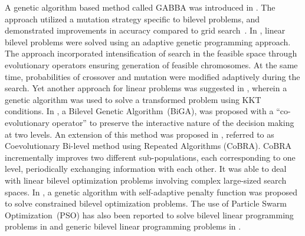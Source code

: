 A genetic algorithm based method called GABBA was introduced in \cite{mathieu1994genetic}. The approach utilized a mutation strategy specific to bilevel problems, and demonstrated improvements in accuracy compared to grid search~\cite{bard1983efficient}. In \cite{wang2007adaptive}, linear bilevel problems were solved using an adaptive genetic programming approach. The approach incorporated intensification of search in the feasible space through evolutionary operators ensuring generation of feasible chromosomes. At the same time, probabilities of crossover and mutation were modified adaptively during the search. Yet another approach for linear problems was suggested in \cite{hejazi2002linear}, wherein a genetic algorithm was used to solve a transformed problem using KKT conditions. In \cite{oduguwa2002bi}, a Bilevel Genetic Algorithm~(BiGA), was proposed with a ``co-evolutionary operator'' to preserve the interactive nature of the decision making at two levels. An extension of this method was proposed in \cite{legillon2012cobra}, referred to as Coevolutionary Bi-level method using Repeated Algorithms (CoBRA). CoBRA incrementally improves two different sub-populations, each corresponding to one level, periodically exchanging information with each other. It was able to deal with linear bilevel optimization problems involving complex large-sized search spaces. In \cite{wang}, a genetic algorithm with self-adaptive penalty function was proposed to solve constrained bilevel optimization problems. The use of Particle Swarm Optimization~(PSO) has also been reported to solve bilevel linear programming problems in \cite{kuo2009application,halter2006bilevel} and generic bilevel linear programming problems in \cite{li2006hierarchical_new}. 

